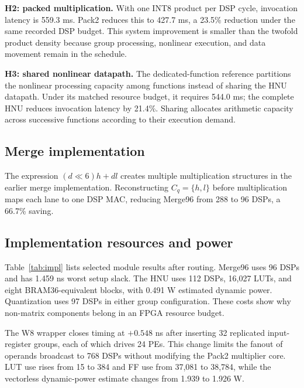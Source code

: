 \documentclass[journal,10pt]{IEEEtran}
\begin{document}
\textbf{H2: packed multiplication.} With one INT8 product per DSP cycle, invocation latency is 559.3 ms. Pack2 reduces this to 427.7 ms, a 23.5\% reduction under the same recorded DSP budget. This system improvement is smaller than the twofold product density because group processing, nonlinear execution, and data movement remain in the schedule.

\textbf{H3: shared nonlinear datapath.} The dedicated-function reference partitions the nonlinear processing capacity among functions instead of sharing the HNU datapath. Under its matched resource budget, it requires 544.0 ms; the complete HNU reduces invocation latency by 21.4\%. Sharing allocates arithmetic capacity across successive functions according to their execution demand.

\subsection{Merge implementation}

The expression $(d\ll6)h+dl$ creates multiple multiplication structures in the earlier merge implementation. Reconstructing $C_q=\{h,l\}$ before multiplication maps each lane to one DSP MAC, reducing Merge96 from 288 to 96 DSPs, a 66.7\% saving.

\subsection{Implementation resources and power}
Table~\ref{tab:impl} lists selected module results after routing. Merge96 uses 96 DSPs and has 1.459 ns worst setup slack. The HNU uses 112 DSPs, 16,027 LUTs, and eight BRAM36-equivalent blocks, with 0.491 W estimated dynamic power. Quantization uses 97 DSPs in either group configuration. These costs show why non-matrix components belong in an FPGA resource budget.

The W8 wrapper closes timing at $+0.548$ ns after inserting 32 replicated input-register groups, each of which drives 24 PEs. This change limits the fanout of operands broadcast to 768 DSPs without modifying the Pack2 multiplier core. LUT use rises from 15 to 384 and FF use from 37,081 to 38,784, while the vectorless dynamic-power estimate changes from 1.939 to 1.926 W.
\end{document}
